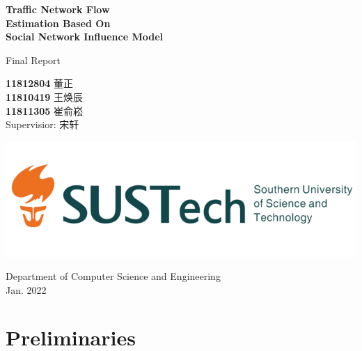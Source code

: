 \documentclass[fontset=none]{ctexart}
\theoremstyle{definition}
\theoremstyle{remark}
\begin{document}
\begin{titlepage}
    \begin{center}
        \vspace*{1cm}
            
        \Huge
        \textbf{Traffic Network Flow\\ Estimation Based On\\ Social Network Influence Model}
            
        \vspace{0.5cm}
        \LARGE
        Final Report\\
            
        \vspace{1.5cm}
            
        \textbf{11812804}  董\quad 正\\
        \textbf{11810419}  王焕辰\\
        \textbf{11811305}  崔俞崧\\

        \vspace{0.5cm}
        Supervisior: 宋轩
            
        \vfill
            
        \includegraphics[width=\textwidth]{images/sustc.png}
            
        \vspace{0.2cm}
            
        \Large
        Department of Computer Science and Engineering\\
        \vspace{0.5cm}
        Jan. 2022
            
    \end{center}
\end{titlepage}

\tableofcontents

\clearpage
\section{Preliminaries}
\end{document}
